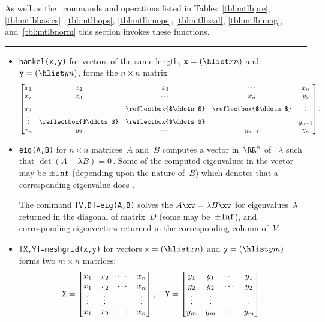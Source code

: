\begin{table}
\caption{As well as the \script\ commands and operations listed in Tables~\ref{tbl:mtlbpre}, \ref{tbl:mtlbbasics}, \ref{tbl:mtlbops}, \ref{tbl:mtlbmops}, \ref{tbl:mtlbsvd}, \ref{tbl:mtlbimag}, and~\ref{tbl:mtlbnorm} this section invokes these functions.} \label{tbl:mtlbexpf}
\smallskip\hrule
\begin{minipage}{\linewidth}
\begin{itemize}
\item {}\verb|hankel(x,y)| for vectors of the same length, \(\verb|x|=(\hlist xn)\) and \(\verb|y|=(\hlist yn)\), forms the \(n\times n\) matrix
\def\adots{\reflectbox{$\ddots$}}
\begin{equation*}
\begin{bmatrix} 
x_1&x_2&x_3&\cdots&x_n \\
x_2&x_3&\cdots&x_n&y_2\\
x_3&&\adots&\adots&\vdots\\
\vdots&\adots&\adots&&y_{n-1}\\
x_n&y_2&\cdots&y_{n-1}&y_n
\end{bmatrix}.
\end{equation*}

\item {}\verb|eig(A,B)| for \(n\times n\) matrices~\(A\) and~\(B\) computes a vector in~\(\RR^n\) of ~\(\lambda\) such that \(\det(A-\lambda B)=0\)\,.
Some of the computed eigenvalues in the vector may be \(\pm\verb|Inf|\) (depending upon the nature of~\(B\)) which denotes that a corresponding eigenvalue does .

The command \verb|[V,D]=eig(A,B)| solves the  \(A\xv=\lambda B\xv\) for eigenvalues~\(\lambda\) returned in the diagonal of matrix~\(D\) (some may be~\(\pm\verb|Inf|\)), and corresponding eigenvectors returned in the corresponding column of~\(V\).

\item {}\verb|[X,Y]=meshgrid(x,y)|  for vectors \(\verb|x|=(\hlist xn)\) and \(\verb|y|=(\hlist ym)\) forms two \(m\times n\) matrices:
\begin{equation*}
\verb|X|=\begin{bmatrix} x_1&x_2&\cdots&x_n\\
 x_1&x_2&\cdots&x_n\\
 \vdots&\vdots&&\vdots\\
 x_1&x_2&\cdots&x_n \end{bmatrix},
 \quad
\verb|Y|=\begin{bmatrix} y_1&y_1&\cdots&y_1\\
 y_2&y_2&\cdots&y_2\\
 \vdots&\vdots&&\vdots\\
 y_m&y_m&\cdots&y_m \end{bmatrix}.
\end{equation*}


\end{itemize}
\end{minipage}
\end{table}

